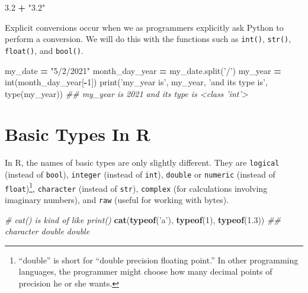 \documentclass[12pt,krantz2]{krantz}
\makeatletter
\newenvironment{Shaded}{\begin{snugshade}}{\end{snugshade}}
\newcommand{\BuiltInTok}[1]{#1}
\newcommand{\CommentTok}[1]{\textcolor[rgb]{0.37,0.37,0.37}{\textit{#1}}}
\newcommand{\DecValTok}[1]{\textcolor[rgb]{0.06,0.06,0.06}{#1}}
\newcommand{\FloatTok}[1]{\textcolor[rgb]{0.06,0.06,0.06}{#1}}
\newcommand{\KeywordTok}[1]{\textcolor[rgb]{0.27,0.27,0.27}{\textbf{#1}}}
\newcommand{\NormalTok}[1]{#1}
\newcommand{\OperatorTok}[1]{\textcolor[rgb]{0.43,0.43,0.43}{\textbf{#1}}}
\newcommand{\StringTok}[1]{\textcolor[rgb]{0.5,0.5,0.5}{#1}}
\newenvironment{kframe}{%
\medskip{}
\setlength{\fboxsep}{.8em}
 \def\at@end@of@kframe{}%
 \ifinner\ifhmode%
  \def\at@end@of@kframe{\end{minipage}}%
  \begin{minipage}{\columnwidth}%
 \fi\fi%
 \def\FrameCommand##1{\hskip\@totalleftmargin \hskip-\fboxsep
 \colorbox{shadecolor}{##1}\hskip-\fboxsep
     \hskip-\linewidth \hskip-\@totalleftmargin \hskip\columnwidth}%
 \MakeFramed {\advance\hsize-\width
   \@totalleftmargin\z@ \linewidth\hsize
   \@setminipage}}%
 {\par\unskip\endMakeFramed%
 \at@end@of@kframe}
\renewenvironment{Shaded}{\begin{kframe}}{\end{kframe}}
\makeatother
\begin{document}
\begin{Shaded}
\begin{Highlighting}[]
\FloatTok{3.2} \OperatorTok{+} \StringTok{"3.2"}
\end{Highlighting}
\end{Shaded}

Explicit conversions occur when we as programmers explicitly ask Python to perform a conversion. We will do this with the functions such as \texttt{int()}, \texttt{str()}, \texttt{float()}, and \texttt{bool()}.

\begin{Shaded}
\begin{Highlighting}[]
\NormalTok{my_date }\OperatorTok{=} \StringTok{"5/2/2021"}
\NormalTok{month_day_year }\OperatorTok{=}\NormalTok{ my_date.split(}\StringTok{'/'}\NormalTok{)}
\NormalTok{my_year }\OperatorTok{=} \BuiltInTok{int}\NormalTok{(month_day_year[}\OperatorTok{-}\DecValTok{1}\NormalTok{]) }
\BuiltInTok{print}\NormalTok{(}\StringTok{'my_year is'}\NormalTok{, my_year, }\StringTok{'and its type is'}\NormalTok{, }\BuiltInTok{type}\NormalTok{(my_year))}
\CommentTok{## my_year is 2021 and its type is <class 'int'>}
\end{Highlighting}
\end{Shaded}

\hypertarget{basic-types-in-r}{%
\section{Basic Types In R}\label{basic-types-in-r}}

In R, the names of basic types are only slightly different. They are \texttt{logical} (instead of \texttt{bool}), \texttt{integer} (instead of \texttt{int}), \texttt{double} or \texttt{numeric} (instead of \texttt{float})\footnote{``double'' is short for ``double precision floating point.'' In other programming languages, the programmer might choose how many decimal points of precision he or she wants.}, \texttt{character} (instead of \texttt{str}), \texttt{complex} (for calculations involving imaginary numbers), and \texttt{raw} (useful for working with bytes).

\begin{Shaded}
\begin{Highlighting}[]
\CommentTok{# cat() is kind of like print()}
\KeywordTok{cat}\NormalTok{(}\KeywordTok{typeof}\NormalTok{(}\StringTok{'a'}\NormalTok{), }\KeywordTok{typeof}\NormalTok{(}\DecValTok{1}\NormalTok{), }\KeywordTok{typeof}\NormalTok{(}\FloatTok{1.3}\NormalTok{))}
\CommentTok{## character double double}
\end{Highlighting}
\end{Shaded}
\end{document}
